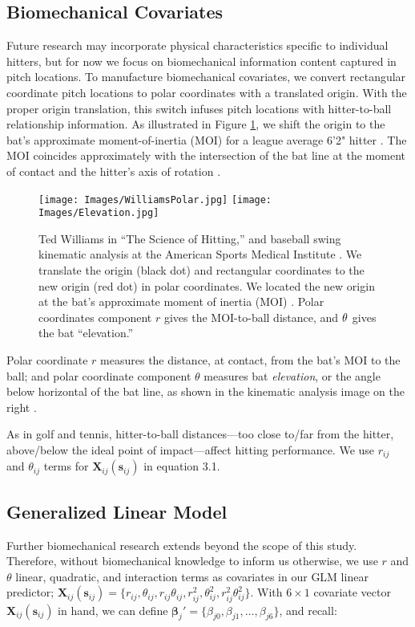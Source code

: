 \subsection{Biomechanical Covariates}

Future research may incorporate physical characteristics specific to individual hitters, but for now we focus on biomechanical information content captured in pitch locations. To manufacture biomechanical covariates, we convert rectangular coordinate pitch locations to polar coordinates with a translated origin. With the proper origin translation, this switch infuses pitch locations with hitter-to-ball relationship information. As illustrated in Figure \ref{fig:polar}, we shift the origin to the bat's approximate moment-of-inertia (MOI) for a league average 6'2" hitter \citep{Fleisig}. The MOI coincides approximately with the intersection of the bat line at the moment of contact and the hitter's axis of rotation \citep{Welch1995}.
  \begin{figure}[H]
	\centering
	\texttt{[image: Images/WilliamsPolar.jpg]}
	\texttt{[image: Images/Elevation.jpg]}
	\caption{Ted Williams in ``The Science of Hitting,'' and baseball swing kinematic analysis at the American Sports Medical Institute \citep{Fortenbaugh2011}. We translate the origin (black dot) and rectangular coordinates to the new origin (red dot) in polar coordinates. We located the new origin at the bat's approximate moment of inertia (MOI) \citep{Fleisig}. Polar coordinates component $r$ gives the MOI-to-ball distance, and $\protect\theta$ gives the bat ``elevation.''}
	\label{fig:polar}
	\end{figure}
Polar coordinate $r$ measures the distance, at contact, from the bat's MOI to the ball; and polar coordinate component $\theta$ measures bat {\it elevation}, or the angle below horizontal of the bat line, as shown in the kinematic analysis image on the right \citep{Fortenbaugh2011}. 

As in golf and tennis, hitter-to-ball distances---too close to/far from the hitter, above/below the ideal point of impact---affect hitting performance. We use $r_{ij}$ and $\theta_{ij}$ terms for $\pmb{X}_{ij}(\pmb{s}_{ij})$ in equation 3.1.

\subsection{Generalized Linear Model} %

Further biomechanical research extends beyond the scope of this study. Therefore, without biomechanical knowledge to inform us otherwise, we use $r$ and $\theta$ linear, quadratic, and interaction terms as covariates in our GLM linear predictor; $\pmb{X}_{ij}(\pmb{s}_{ij}) = \{r_{ij}, \theta_{ij}, r_{ij}\theta_{ij}, r_{ij}^{2}, \theta_{ij}^{2}, r_{ij}^{2}\theta_{ij}^{2}\}$. With $6 \times 1$ covariate vector $\pmb{X}_{ij}(\pmb{s}_{ij})$ in hand, we can define $\pmb{\beta}_{j}' =  \{\beta_{j0}, \beta_{j1}, \dots, \beta_{j6}\}$, and recall:

